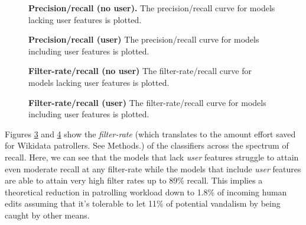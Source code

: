 \documentclass{sig-alternate}
\begin{document}
\begin{figure}
\label{fig:precision_recall_no_user}
\centering
{}
\caption{\textbf{Precision/recall (no user).} The precision/recall curve for models lacking user features is plotted.}
\end{figure}

\begin{figure}
\label{fig:precision_recall_user}
\centering
{}
\caption{\textbf{Precision/recall (user)} The precision/recall curve for models including user features is plotted.}
\end{figure}

\begin{figure}
\label{fig:filter_rate_no_user}
\centering
{}
\caption{\textbf{Filter-rate/recall (no user)} The filter-rate/recall curve for models lacking user features is plotted.}
\end{figure}

\begin{figure}
\label{fig:filter_rate_user}
\centering
{}
\caption{\textbf{Filter-rate/recall (user)} The filter-rate/recall curve for models including user features is plotted.}
\end{figure}


Figures \ref{fig:filter_rate_no_user} and \ref{fig:filter_rate_user} show the \textit{filter-rate} (which translates to the amount effort saved for Wikidata patrollers.  See Methods.) of the classifiers across the spectrum of recall.  Here, we can see that the models that lack \textit{user} features struggle to attain even moderate recall at any filter-rate while the models that include \textit{user} features are able to attain very high filter rates up to 89\% recall.  This implies a theoretical reduction in patrolling workload down to 1.8\% of incoming human edits assuming that it's tolerable to let 11\% of potential vandalism by being caught by other means.
\end{document}
